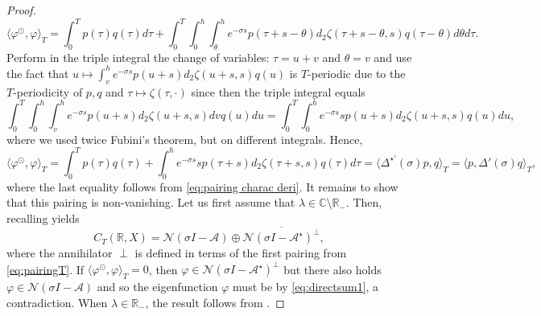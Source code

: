 \documentclass[english]{myarticle}
\begin{document}
\begin{sloppypar}
\begin{proposition}
\begin{proof}
\begin{equation}
    \langle \varphi^\odot, \varphi  \rangle_T = \int_0^T p(\tau)q(\tau) d\tau + \int_0^T \int_0^h \int_\theta^h e^{- \sigma s} p(\tau + s - \theta) d_2 \zeta(\tau+s-\theta,s)q(\tau-\theta) d\theta d\tau.
\end{equation}
Perform in the triple integral the change of variables: $\tau = u+v$ and $\theta = v$ and use the fact that $u \mapsto \int_v^h e^{-\sigma s} p(u+s) d_2 \zeta(u+s,s)q(u)$ is $T$-periodic due to the $T$-periodicity of $p,q$ and $\tau \mapsto \zeta(\tau,\cdot)$ since then the triple integral equals
\begin{equation*}
    \int_0^T \int_0^h \int_v^h e^{-\sigma s} p(u+s) d_2 \zeta(u+s,s) dv q(u) du = \int_0^T \int_0^h e^{-\sigma s} s p(u+s) d_2 \zeta(u+s,s) q(u) du,
\end{equation*}
where we used twice Fubini's theorem, but on different integrals. Hence,
\begin{equation*}
    \langle \varphi^\odot, \varphi  \rangle_T = \int_0^T p(\tau)q(\tau) + \int_0^h e^{-\sigma s} s p(\tau+s) d_2 \zeta(\tau+s,s) q(\tau) d\tau = \langle \Delta^{\star \prime }(\sigma)p, q \rangle_T = \langle p, \Delta'(\sigma)q \rangle_T,
\end{equation*}
where the last equality follows from \eqref{eq:pairing charac deri}. It remains to show that this pairing is non-vanishing. Let us first assume that $\lambda \in \mathbb{C} \setminus \mathbb{R}_{-}$. Then, recalling \cite[Corollary 25]{Article1} yields
\begin{equation} \label{eq:directsum1}
    C_T(\mathbb{R},X) = \mathcal{N}(\sigma I - \mathcal{A}) \oplus \overline{\mathcal{N}(\sigma I -\mathcal{A}^\star)^{\perp}},
\end{equation}
where the annihilator $\perp$ is defined in terms of the first pairing from \eqref{eq:pairingT}. If $\langle \varphi^\odot, \varphi \rangle_T = 0$, then $\varphi \in \mathcal{N}(\sigma I -\mathcal{A}^\star)^{\perp}$ but there also holds $\varphi \in \mathcal{N}(\sigma I - \mathcal{A})$ and so the eigenfunction $\varphi$ must be by \eqref{eq:directsum1}, a contradiction. When $\lambda \in \mathbb{R}_{-}$, the result follows from \cite[Remark 25]{Article1}.


\end{proof}
\end{proposition}
\end{sloppypar}
\end{document}
